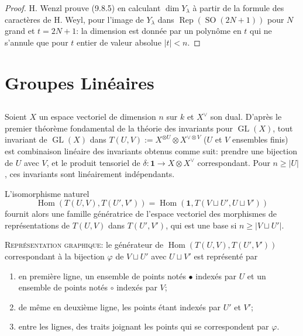 \documentclass[11pt,a4paper]{article}
\theoremstyle{plain}
\theoremstyle{definition}
\DeclareMathOperator{\Hom}{Hom}
\DeclareMathOperator{\Rep}{Rep}
\DeclareMathOperator{\GL}{GL}
\DeclareMathOperator{\SO}{SO}
\begin{document}
\begin{proof}
H. Wenzl prouve (9.8.5) en calculant $\dim Y_\lambda$ \`a partir de la formule des caract\`eres de H. Weyl, pour l'image de $Y_\lambda$ dans $\Rep(\SO(2N+1))$ pour $N$ grand et $t = 2N + 1$: la dimension est donn\'ee par un polyn\^ome en $t$ qui ne s'annule que pour $t$ entier de valeur absolue $|t| < n$.
\end{proof}


\section{Groupes Lin\'eaires}

\subsection{}
Soient $X$ un espace vectoriel de dimension $n$ sur $k$ et $X^\vee$ son dual. D'apr\`es le premier th\'eor\`eme fondamental de la th\'eorie des invariants pour $\GL(X)$, tout invariant de $\GL(X)$ dans $T(U, V) := X^{\otimes U} \otimes X^{\vee \otimes V}$ ($U$ et $V$ ensembles finis) est combinaison lin\'eaire des invariants obtenus comme suit: prendre une bijection de $U$ avec $V$, et le produit tensoriel de $\delta : \mathbf{1} \to X \otimes X^\vee$ correspondant. Pour $n \geq |U|$, ces invariants sont lin\'eairement ind\'ependants.

L'isomorphisme naturel
\begin{equation}
\Hom(T(U, V), T(U', V')) = \Hom(\mathbf{1}, T(V \sqcup U', U \sqcup V')) \tag{10.1.1}
\end{equation}
fournit alors une famille g\'en\'eratrice de l'espace vectoriel des morphismes de repr\'esentations de $T(U, V)$ dans $T(U', V')$, qui est une base si $n \geq |V \sqcup U'|$.

\textsc{Repr\'esentation graphique}: le g\'en\'erateur de $\Hom(T(U, V), T(U', V'))$ correspondant \`a la bijection $\varphi$ de $V \sqcup U'$ avec $U \sqcup V'$ est repr\'esent\'e par
\begin{enumerate}[label=\alph*)]
\item en premi\`ere ligne, un ensemble de points not\'es $\bullet$ index\'es par $U$ et un ensemble de points not\'es $\circ$ index\'es par $V$;
\item de m\^eme en deuxi\`eme ligne, les points \'etant index\'es par $U'$ et $V'$;
\item entre les lignes, des traits joignant les points qui se correspondent par $\varphi$.
\end{enumerate}
\end{document}
